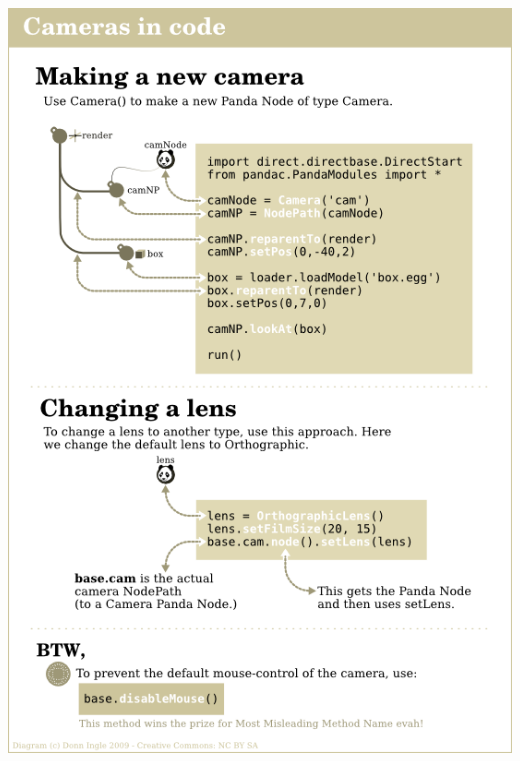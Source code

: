 \documentclass[a4paper,10pt]{book}
\begin{document}
\begin{center}
\includegraphics[scale=0.8]{CameraCode.png} 
\end{center}
\end{document}
